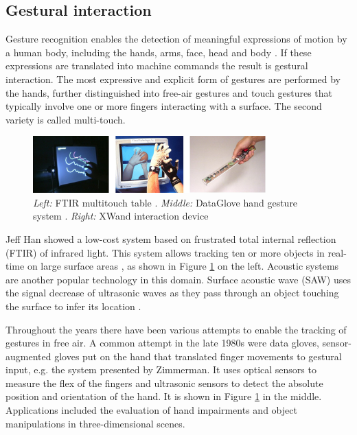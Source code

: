 \subsection{Gestural interaction}
Gesture recognition enables the detection of meaningful expressions of motion by a human body, including the hands, arms, face, head and body \cite{mitra2007gesture}. If these expressions are translated into machine commands the result is gestural interaction. The most expressive and explicit form of gestures are performed by the hands, further distinguished into free-air gestures and touch gestures that typically involve one or more fingers interacting with a surface. The second variety is called multi-touch.

\begin{figure}[ht]
\centering
\includegraphics[width=0.8\textwidth]{images/rel_app_gesture}
\caption{\emph{Left:} FTIR multitouch table \cite{Han2005}. \emph{Middle:} DataGlove hand gesture system \cite{zimmerman1987hand}. \emph{Right:} XWand interaction device \cite{Wilson2003}}
\label{fig:rel_app_gesture}
\end{figure}

Jeff Han showed a low-cost system based on frustrated total internal reflection (FTIR) of infrared light. This system allows tracking ten or more objects in real-time on large surface areas \cite{Han2005}, as shown in Figure \ref{fig:rel_app_gesture} on the left. Acoustic systems are another popular technology in this domain. Surface acoustic wave (SAW) uses the signal decrease of ultrasonic waves as they pass through an object touching the surface to infer its location \cite{Armstrong1998}.
  
Throughout the years there have been various attempts to enable the tracking of gestures in free air. A common attempt in the late 1980s were data gloves, sensor-augmented gloves put on the hand that translated finger movements to gestural input, e.g. the system presented by Zimmerman\cite{zimmerman1987hand}. It uses optical sensors to measure the flex of the fingers and ultrasonic sensors to detect the absolute position and orientation of the hand. It is shown in Figure \ref{fig:rel_app_gesture} in the middle. Applications included the evaluation of hand impairments and object manipulations in three-dimensional scenes.

